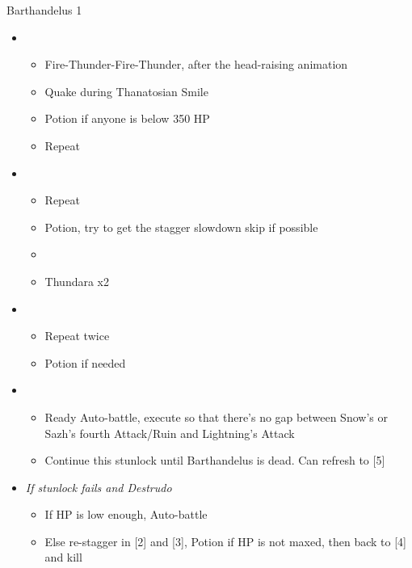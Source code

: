 \begin{battle}[2:15]{Barthandelus 1}
\begin{itemize}
\begin{itemize}
				      \item Kill the Left Pauldron if it survives
				      \item Potion while Barthandelus's head is up in the air
			      \end{itemize}
			\item \second
			      \begin{itemize}
				      \item Fire-Thunder-Fire-Thunder, after the head-raising animation
				      \item Quake during Thanatosian Smile
				      \item Potion if anyone is below 350 HP
				      \item Repeat
			      \end{itemize}
			\item \third
			      \begin{itemize}
				      \item Repeat
				      \item Potion, try to get the stagger slowdown skip if possible
				      \item \stagger
				      \item Thundara x2
			      \end{itemize}
			\item \second
			      \begin{itemize}
				      \item Repeat twice
				      \item Potion if needed
			      \end{itemize}
			\item \fourth
			      \begin{itemize}
				      \item Ready Auto-battle, execute so that there's no gap between Snow's or Sazh's fourth Attack/Ruin and Lightning's Attack
				      \item Continue this stunlock until Barthandelus is dead. Can refresh to [5]
			      \end{itemize}
			\item \textit{If stunlock fails and Destrudo}
			      \begin{itemize}
				      \item If HP is low enough, Auto-battle
				      \item Else re-stagger in [2] and [3], Potion if HP is not maxed, then back to [4] and kill
			      \end{itemize}
		\end{itemize}
\end{battle}
\vfill
\ 
\columnbreak
